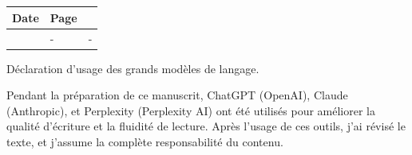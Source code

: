 \chapter*{}
\vspace{-1.5cm}
    \begin{minipage}[r]{.95\textwidth}\raggedleft
    \HUGE\bfseries\ErrataName
    \end{minipage}

\vspace{2.5cm}

\noindent
\lipsum[1]
\vspace{.5cm}
\begin{longtable}{p{2.5cm}p{1.45cm}p{9cm}}
	Date & Page&   \\\hline
\Date	& -	& -
\end{longtable}

Déclaration d'usage des grands modèles de langage. 

Pendant la préparation de ce manuscrit, ChatGPT (OpenAI), Claude (Anthropic), et Perplexity (Perplexity AI) ont été utilisés pour améliorer la qualité d'écriture et la fluidité de lecture. 
Après l'usage de ces outils, j'ai révisé le texte, et j'assume la complète responsabilité du contenu. 



